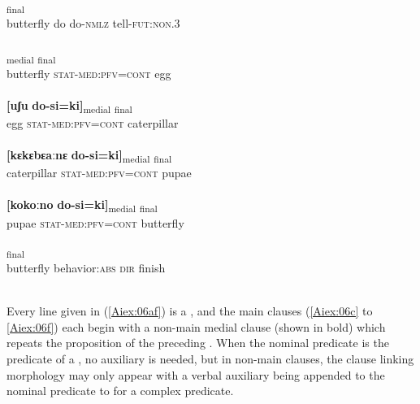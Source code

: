 \documentclass[output=paper]{LSP/langsci}
\begin{document}
\begin{exe}
\ex \label{Aiex:06af}
\begin{xlist}
\ex \label{Aiex:06a}
\textsubscript{final}\\
butterfly do do-\textsc{nmlz} tell-\textsc{fut}:\textsc{non}.\textsc{3}\\
\glt {}\\
\ex \label{Aiex:06b}
\gll [ɛjaːgɛ	do-si=ki]\textsubscript{medial} \underline{\smash{[uʃu]}}\textsubscript{final}\\
butterfly \textsc{stat}-\textsc{med}:\textsc{pfv}=\textsc{cont} egg\\
\glt {}\\
\ex \label{Aiex:06c}
\gll \textbf{[uʃu}	\textbf{do-si=ki]}\textsubscript{medial}	\underline{\smash{[kɛkɛbɛaːnɛ]}}\textsubscript{final}\\
egg	\textsc{stat}-\textsc{med}:\textsc{pfv}=\textsc{cont} caterpillar\\
\glt {}\\
\ex \label{Aiex:06d}
\gll \textbf{[kɛkɛbɛaːnɛ} \textbf{do-si=ki]}\textsubscript{medial} \underline{\smash{[kokoːno]}}\textsubscript{final}\\
caterpillar \textsc{stat}-\textsc{med:}\textsc{pfv}=\textsc{cont} pupae\\
\glt {}\\
\ex \label{Aiex:06e}
\gll \textbf{[kokoːno} \textbf{do-si=ki]}\textsubscript{medial} \underline{\smash{[ɛja:gɛ]}}\textsubscript{final}\\
pupae \textsc{stat}-\textsc{med}:\textsc{pfv}=\textsc{cont} butterfly\\
\glt {}\\
\ex \label{Aiex:06f}
\textsubscript{final}\\
butterfly	behavior:\textsc{abs} \textsc{dir}	finish\\
\glt {}\\
\end{xlist}
\end{exe}

Every line given in (\ref{Aiex:06af}) is a , and the main clauses (\ref{Aiex:06c} to \ref{Aiex:06f}) each begin with a non-main medial
clause (shown in bold) which repeats the proposition of the preceding . When the nominal
predicate is the predicate of a , no auxiliary is needed, but in non-main clauses, the clause
linking morphology may only appear with a verbal auxiliary being appended to the nominal predicate to
for a complex predicate.
\end{document}
